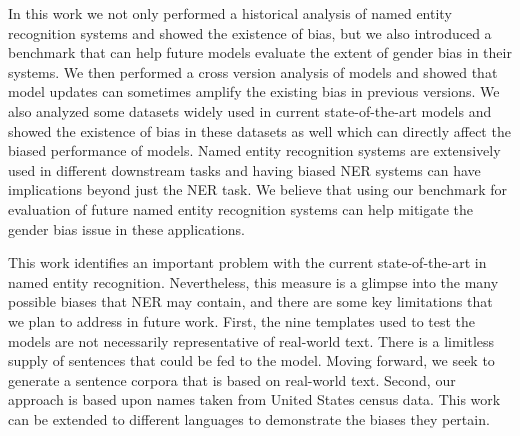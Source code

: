 In this work we not only performed a historical analysis of named entity recognition systems and showed the existence of bias, but we also introduced a benchmark that can help future models evaluate the extent of gender bias in their systems. We then performed a cross version analysis of models and showed that model updates can sometimes amplify the existing bias in previous versions. We also analyzed some datasets widely used in current state-of-the-art models and showed the existence of bias in these datasets as well which can directly affect the biased performance of models. Named entity recognition systems are extensively used in different downstream tasks and having biased NER systems can have implications beyond just the NER task. We believe that using our benchmark for evaluation of future named entity recognition systems can help mitigate the gender bias issue in these applications.

This work identifies an important problem with the current state-of-the-art in named entity recognition. Nevertheless, this measure is a glimpse into the many possible biases that NER may contain, and there are some key limitations that we plan to address in future work. First, the nine templates used to test the models are not necessarily representative of real-world text. There is a limitless supply of sentences that could be fed to the model. Moving forward, we seek to generate a sentence corpora that is based on real-world text. Second, our approach is based upon names taken from United States census data. This work can be extended to different languages to demonstrate the biases they pertain.

